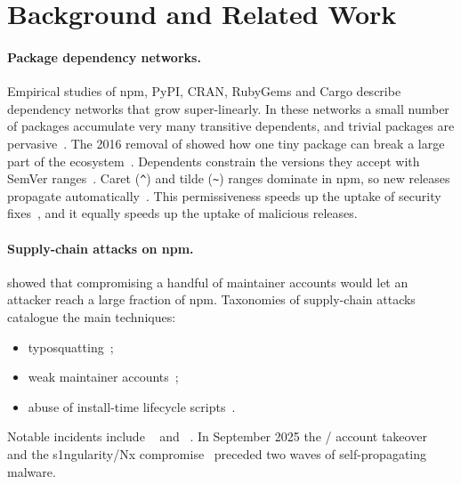 \section{Background and Related Work}\label{sec:background}

\paragraph{Package dependency networks.}
Empirical studies of npm, PyPI, CRAN, RubyGems and Cargo describe dependency networks that grow
super-linearly. In these networks a small number of packages accumulate very many transitive dependents,
and trivial packages are pervasive~\citep{kikas2017structure,decan2019empirical,abdalkareem2017trivial}.
The 2016 removal of  showed how one tiny package can break a large part of the
ecosystem~\citep{npm2016leftpad}. Dependents constrain the versions they accept with SemVer
ranges~\citep{prestonwerner2013semver}. Caret (\texttt{\^{}}) and tilde (\texttt{\~{}}) ranges dominate
in npm, so new releases propagate automatically~\citep{decan2021semver,pinckney2023semver}. This
permissiveness speeds up the uptake of security fixes~\citep{pinckney2023semver}, and it equally speeds
up the uptake of malicious releases.

\paragraph{Supply-chain attacks on npm.}
\citet{zimmermann2019smallworld} showed that compromising a handful of maintainer accounts would let an
attacker reach a large fraction of npm. Taxonomies of supply-chain attacks~\citep{ohm2020backstabber,
ladisa2023sok} catalogue the main techniques:
\begin{itemize}
  \item typosquatting~\citep{taylor2020typosquatting};
  \item weak maintainer accounts~\citep{zahan2022weaklinks};
  \item abuse of install-time lifecycle scripts~\citep{wyss2022latch}.
\end{itemize}
Notable incidents include ~\citep{npm2018eventstream} and
~\citep{github2021uaparser}. In September 2025 the / account
takeover~\citep{aikido2025chalkdebug} and the s1ngularity/Nx compromise~\citep{wiz2025singularity}
preceded two waves of self-propagating malware.

